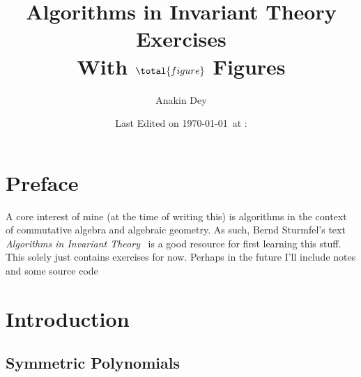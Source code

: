 \documentclass[letterpaper, 11pt, oneside]{book}
\title{\vspace{-100pt} {\Huge Algorithms in Invariant Theory Exercises} \\ {\small With $\total{figure}$ Figures}}
\author{\Large Anakin Dey}
\date{\small Last Edited on \today\ at \DTMfetchhour{now}:\DTMfetchminute{now}}
\newcommand{\CoverName}{Cover}
\begin{document}
\frontmatter
\renewcommand{\thepage}{\CoverName}
\maketitle


\tableofcontents
\clearpage


%

\chapter*{Preface}

A core interest of mine (at the time of writing this) is algorithms in the context of commutative algebra and algebraic geometry.
As such, Bernd Sturmfel's text \emph{Algorithms in Invariant Theory}~\cite{book:AlgosInInvTheory} is a good resource for first learning this stuff.
This solely just contains exercises for now.
Perhaps in the future I'll include notes and some source code

\mainmatter

\chapter{Introduction}

\section*{Symmetric Polynomials}
\end{document}
